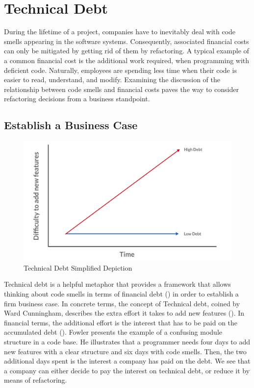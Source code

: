 \chapter{Technical Debt}
\label{sec:Business}

During the lifetime of a project, companies have to inevitably deal with code smells appearing in the software systems. Consequently, associated financial costs can only be mitigated by getting rid of them by refactoring.  A typical example of a common financial cost is the additional work required, when programming with deficient code. Naturally, employees are spending less time when their code is easier to read, understand, and modify. Examining the discussion of the relationship between code smells  and financial costs paves the way to consider refactoring decisions from a business standpoint.

\section{Establish a Business Case}
\label{sec:business-case}
\begin{figure}[H]
    \centering
    \includegraphics[width=0.6\columnwidth]{./assets/technical_debt}
    \caption{Technical Debt Simplified Depiction}
\end{figure}
Technical debt is a helpful metaphor 
	that provides a framework that allows thinking about code smells 
	in terms of financial debt (\cite{fowler2019}) in order to establish a firm business case.
In concrete terms, the concept of Technical debt, coined by Ward Cunningham, describes the extra effort it takes to add new features (\cite{kruchten2012}). 
In financial terms, the additional effort is the interest that has to be paid on the accumulated debt (\cite{fowler}). 
Fowler presents the example 
	of a confusing module structure in a code base.
He illustrates that 
	a programmer needs four days to add new features 
	with a clear structure and six days with code smells. 
Then, the two additional days spent is the interest a company has paid on the debt.
We see that a company can either decide to pay the interest on technical debt, 
	or reduce it by means of refactoring. 

